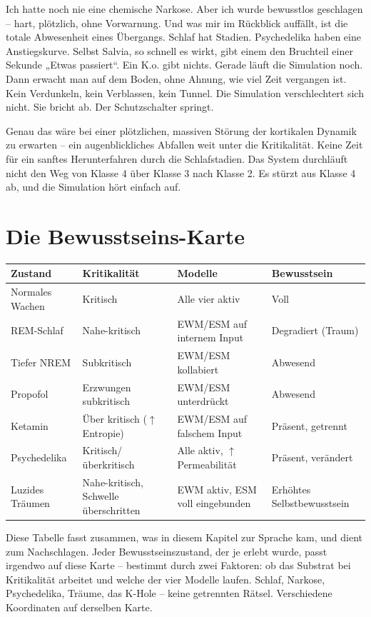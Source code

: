 \documentclass[11pt, twoside, openright]{book}
\begin{document}
Ich hatte noch nie eine chemische Narkose. Aber ich wurde bewusstlos geschlagen -- hart, plötzlich, ohne Vorwarnung. Und was mir im Rückblick auffällt, ist die totale Abwesenheit eines Übergangs. Schlaf hat Stadien. Psychedelika haben eine Anstiegskurve. Selbst Salvia, so schnell es wirkt, gibt einem den Bruchteil einer Sekunde „Etwas passiert“. Ein K.o. gibt nichts. Gerade läuft die Simulation noch. Dann erwacht man auf dem Boden, ohne Ahnung, wie viel Zeit vergangen ist. Kein Verdunkeln, kein Verblassen, kein Tunnel. Die Simulation verschlechtert sich nicht. Sie bricht ab. Der Schutzschalter springt.

Genau das wäre bei einer plötzlichen, massiven Störung der kortikalen Dynamik zu erwarten -- ein augenblickliches Abfallen weit unter die Kritikalität. Keine Zeit für ein sanftes Herunterfahren durch die Schlafstadien. Das System durchläuft nicht den Weg von Klasse 4 über Klasse 3 nach Klasse 2. Es stürzt aus Klasse 4 ab, und die Simulation hört einfach auf.

\section*{Die Bewusstseins-Karte}


{\footnotesize
\noindent
\begin{tabularx}{\linewidth}{Y Y Y Y}
\toprule
\textbf{Zustand} & \textbf{Kritikalität} & \textbf{Modelle} & \textbf{Bewusstsein} \\
\midrule
Normales Wachen & Kritisch & Alle vier aktiv & Voll \\[4pt]
REM-Schlaf & Nahe-kritisch & EWM/ESM auf internem Input & Degradiert (Traum) \\[4pt]
Tiefer NREM & Subkritisch & EWM/ESM kollabiert & Abwesend \\[4pt]
Propofol & Erzwungen subkritisch & EWM/ESM unterdrückt & Abwesend \\[4pt]
Ketamin & Über kritisch ($\uparrow$ Entropie) & EWM/ESM auf falschem Input & Präsent, getrennt \\[4pt]
Psychedelika & Kritisch/\-überkritisch & Alle aktiv, $\uparrow$ Permeabilität & Präsent, verändert \\[4pt]
Luzides Träumen & Nahe-kritisch, Schwelle überschritten & EWM aktiv, ESM voll eingebunden & Erhöhtes Selbst\-be\-wusst\-sein \\[4pt]
\bottomrule
\end{tabularx}
}


Diese Tabelle fasst zusammen, was in diesem Kapitel zur Sprache kam, und dient zum Nachschlagen. Jeder Bewusstseinszustand, der je erlebt wurde, passt irgendwo auf diese Karte -- bestimmt durch zwei Faktoren: ob das Substrat bei Kritikalität arbeitet und welche der vier Modelle laufen. Schlaf, Narkose, Psychedelika, Träume, das K-Hole -- keine getrennten Rätsel. Verschiedene Koordinaten auf derselben Karte.
\end{document}
